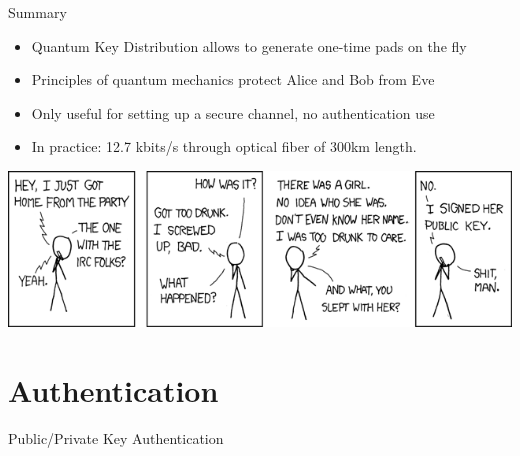 \documentclass{beamer}
\begin{document}
	\begin{frame}{Summary} %
		\begin{itemize}
			\item Quantum Key Distribution allows to generate one-time pads on the fly
			\item Principles of quantum mechanics protect Alice and Bob from Eve
			\item Only useful for setting up a secure channel, no authentication use
			\item In practice: 12.7 kbits/s through optical fiber of 300km length.
		\end{itemize}
	\end{frame}

	\begin{frame}
		\begin{center}
		\includegraphics[width=\textwidth]{images/xkcd-responsible_behavior}
		\end{center}
	\end{frame}


	\section{Authentication}

	\begin{frame}{Public/Private Key Authentication} %

	\end{frame}


	\begin{frame}[plain]\end{frame}
\end{document}
